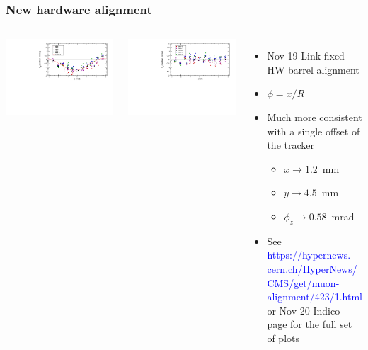 \documentclass[compress]{beamer}
\begin{document}
\begin{frame}
\frametitle{New hardware alignment}

\begin{columns}
\includegraphics[width=\linewidth]{NovHardware_vs_phi.pdf}

\includegraphics[width=\linewidth]{NovHardwareADJUSTED_vs_phi.pdf}

\begin{itemize}
\item Nov 19 Link-fixed HW barrel alignment

\item $\phi = x / R$

\item Much more consistent with a single offset of the tracker
\begin{itemize}
\item $x \to 1.2$~mm
\item $y \to 4.5$~mm
\item $\phi_z \to 0.58$~mrad
\end{itemize}

\item See \textcolor{blue}{https://hypernews. cern.ch/HyperNews/ CMS/get/muon-alignment/423/1.html} or Nov 20 Indico page for the full set of plots

\end{itemize}
\end{columns}
\end{frame}
\end{document}
